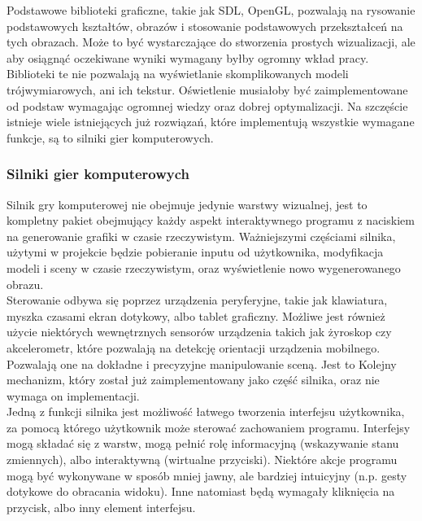 \documentclass{article} %
\begin{document}
        Podstawowe biblioteki graficzne, takie jak SDL, OpenGL, pozwalają na rysowanie podstawowych kształtów, obrazów i stosowanie podstawowych przekształceń na tych obrazach. Może to być wystarczające do stworzenia prostych wizualizacji, ale aby osiągnąć oczekiwane wyniki wymagany byłby ogromny wkład pracy. Biblioteki te nie pozwalają na wyświetlanie skomplikowanych modeli trójwymiarowych, ani ich tekstur. Oświetlenie musiałoby być zaimplementowane od podstaw wymagając ogromnej wiedzy oraz dobrej optymalizacji. Na szczęście istnieje wiele istniejących już rozwiązań, które implementują wszystkie wymagane funkcje, są to silniki gier komputerowych.
        \\

        
        \subsubsection{Silniki gier komputerowych}
        Silnik gry komputerowej nie obejmuje jedynie warstwy wizualnej, jest to kompletny pakiet obejmujący każdy aspekt interaktywnego programu z naciskiem na generowanie grafiki w czasie rzeczywistym. Ważniejszymi częściami silnika, użytymi w projekcie będzie pobieranie inputu od użytkownika, modyfikacja modeli i sceny w czasie rzeczywistym, oraz wyświetlenie nowo wygenerowanego obrazu.
        \\
        
        Sterowanie odbywa się poprzez urządzenia peryferyjne, takie jak klawiatura, myszka czasami ekran dotykowy, albo tablet graficzny. Możliwe jest również użycie niektórych wewnętrznych sensorów urządzenia takich jak żyroskop czy akcelerometr, które pozwalają na detekcję orientacji urządzenia mobilnego. Pozwalają one na dokładne i precyzyjne manipulowanie sceną. Jest to Kolejny mechanizm, który został już zaimplementowany jako część silnika, oraz nie wymaga on implementacji.
        \\
        
        Jedną z funkcji silnika jest możliwość łatwego tworzenia interfejsu użytkownika, za pomocą którego użytkownik może sterować zachowaniem programu. Interfejsy mogą składać się z warstw, mogą pełnić rolę informacyjną (wskazywanie stanu zmiennych), albo interaktywną (wirtualne przyciski). Niektóre akcje programu mogą być wykonywane w sposób mniej jawny, ale bardziej intuicyjny (n.p. gesty dotykowe do obracania widoku). Inne natomiast będą wymagały kliknięcia na przycisk, albo inny element interfejsu.
        \\
        
\end{document}
